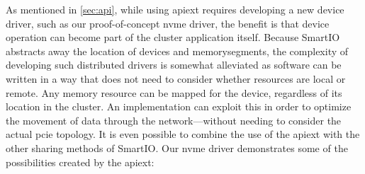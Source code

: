 As mentioned in \cref{sec:api}, while using \gls{apiext} requires developing a new device driver, such as our proof-of-concept \gls{nvme} driver, the benefit is that device operation can become part of the cluster application itself.
%
Because SmartIO abstracts away the location of devices and \glspl{memorysegment}, the complexity of developing such distributed drivers is somewhat alleviated as software can be written in a way that does not need to consider whether resources are local or remote.
%
Any memory resource can be mapped for the device, regardless of its location in the cluster.
%
An implementation can exploit this in order to optimize the movement of data through the network---without needing to consider the actual \gls{pcie} topology.
%
It is even possible to combine the use of the \gls{apiext} with the other sharing methods of SmartIO.
%
Our \gls{nvme} driver demonstrates some of the possibilities created by the \gls{apiext}: 
%
